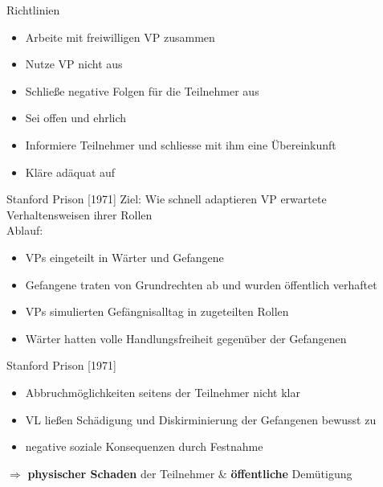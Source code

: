 \documentclass[10pt]{beamer}
\begin{document}
	\begin{frame}{Richtlinien}
		
		\begin{itemize}
			\item Arbeite mit freiwilligen VP zusammen
			\item Nutze VP nicht aus
			\item Schließe negative Folgen für die Teilnehmer aus
			\item Sei offen und ehrlich
			\item Informiere Teilnehmer und schliesse mit ihm eine Übereinkunft
			\item Kläre adäquat auf
		
		\end{itemize}
		
	\end{frame}
	
	\begin{frame}{Stanford Prison [1971]}
		Ziel: Wie schnell adaptieren VP erwartete Verhaltensweisen ihrer Rollen \\
		
		Ablauf:
		\begin{itemize}
			\item VPs eingeteilt in Wärter und Gefangene
			\item Gefangene traten von Grundrechten ab und wurden öffentlich verhaftet
			\item VPs simulierten Gefängnisalltag in zugeteilten Rollen
			\item Wärter hatten volle Handlungsfreiheit gegenüber der Gefangenen
		\end{itemize}
		
	\end{frame}	
	
	\begin{frame}{Stanford Prison [1971]}
		\begin{itemize}
			\item Abbruchmöglichkeiten seitens der Teilnehmer nicht klar
			\item VL ließen Schädigung und Diskirminierung der Gefangenen bewusst zu
			\item negative soziale Konsequenzen durch Festnahme
		\end{itemize}
		$\Rightarrow$ \textbf{physischer Schaden} der Teilnehmer \& \textbf{öffentliche} Demütigung
	\end{frame}	
	
\end{document}

